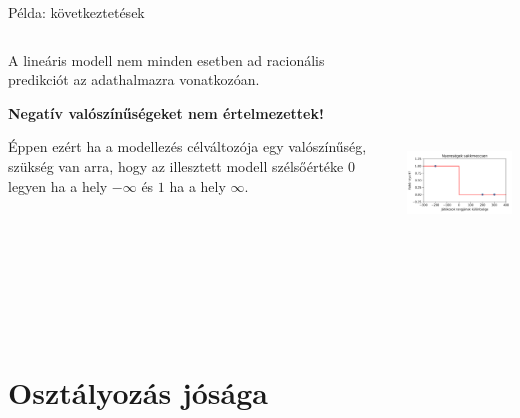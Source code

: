 \documentclass[english, aspectratio=169]{beamer}
\makeatletter
\let\origtableofcontents=\tableofcontents
\def\tableofcontents{\@ifnextchar[{\origtableofcontents}{\gobbletableofcontents}}
\def\gobbletableofcontents#1{\origtableofcontents}
\makeatother
\begin{document}
\begin{frame}{Példa: következtetések}
\begin{columns}
\begin{column}{.5\textwidth}
A lineáris modell nem minden esetben ad racionális predikciót az adathalmazra vonatkozóan.\par\smallskip
\textbf{Negatív valószínűségeket nem értelmezettek!}\par\smallskip
Éppen ezért ha a modellezés célváltozója egy valószínűség, szükség van arra, hogy az illesztett modell szélsőértéke $0$ legyen ha a hely $-\infty$ és $1$ ha a hely $\infty$.
\end{column}
\begin{column}{.5\textwidth}
\begin{center}
\includegraphics[width=7cm, height=7cm, keepaspectratio]{images/osztalyozas_14.png}
\end{center}
\end{column}
\end{columns}
\end{frame}

\section{Osztályozás jósága}

\begin{frame}
\tableofcontents[currentsection]
\end{frame}
\end{document}
